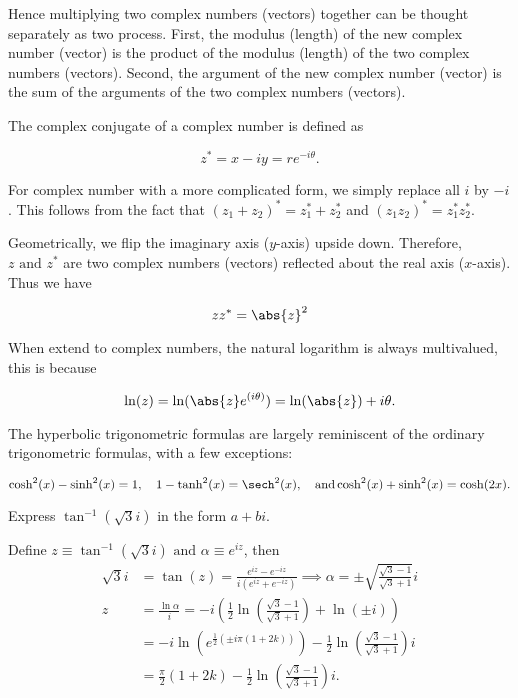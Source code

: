 \documentclass[english,a4paper,12pt]{report}
\begin{document}
Hence multiplying two complex numbers (vectors) together can be thought separately as two process. First, the modulus (length) of the new complex number (vector) is the product of the modulus (length) of the two complex numbers (vectors). Second, the argument of the new complex number (vector) is the sum of the arguments of the two complex numbers (vectors).

The complex conjugate of a complex number is defined as 

\begin{equation}
	z^* = x-iy = re^{-i \theta }.
\end{equation}

For complex number with a more complicated form, we simply replace all \(i\) by \(-i\). This follows from the fact that \((z_1 + z_2 )^* = z_1 ^* + z_2 ^*\) and \((z_1 z_2 )^* = z_1 ^* z_2 ^*\).  

Geometrically, we flip the imaginary axis (\(y\)-axis) upside down. Therefore, \(z \text { and } z^*\) are two complex numbers (vectors) reflected about the real axis (\(x\)-axis). Thus we have

\begin{equation}
	z z^* = \abs{z}^2 
\end{equation}

When extend to complex numbers, the natural logarithm is always multivalued, this is because 

\begin{equation}
    \ln (z) = \ln (\abs{z}e^{(i \theta )}  ) = \ln (\abs{z} ) + i \theta .
\end{equation}

The hyperbolic trigonometric formulas are largely reminiscent of the ordinary trigonometric formulas, with a few exceptions:

\begin{equation}
    \cosh^2(x) - \sinh^2(x) = 1, \quad 1 - \tanh^2(x) = \sech^2(x), \quad \text{and} \cosh^2(x) + \sinh^2(x) = \cosh(2x).
\end{equation}




{Express \(\tan ^{-1} {(\sqrt{3}i )} \) in the form \(a+bi\). }
{Define \(z \equiv \tan ^{-1} {(\sqrt{3}i)} \text { and } \alpha \equiv e^{iz} \), then 
\begin{equation}
    \begin{aligned}
        \sqrt{3}i &= \tan (z) = \frac{e^{iz}-e^{-iz}  }{i(e^{iz} +e^{-iz} )} \implies \alpha = \pm \sqrt{\frac{\sqrt{3}-1 }{\sqrt{3}+1 } }i \\
        z &= \frac{\ln \alpha }{i} = -i\left( \frac{1}{2}\ln \left(\frac{\sqrt{3}-1 }{\sqrt{3}+1 }\right) + \ln (\pm i)  \right) \\ &= -i\ln (e^{\frac{1}{2}(\pm i\pi (1+2k)) } ) - \frac{1}{2}\ln \left( \frac{\sqrt{3}-1 }{\sqrt{3} +1}  \right) i \\ &= \frac{\pi }{2}(1+2k) - \frac{1}{2}\ln \left( \frac{\sqrt{3}-1 }{\sqrt{3}+1 } \right)i.      
    \end{aligned}
\end{equation}~

 } 
\end{document}
